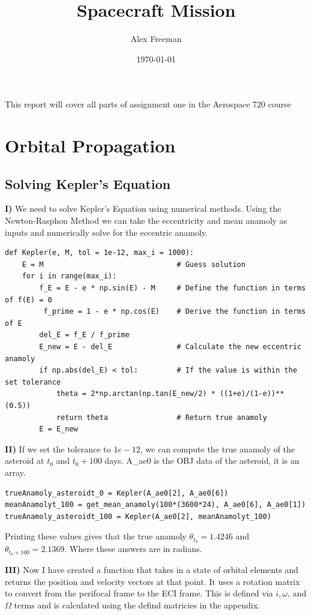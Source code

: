 \documentclass[a4paper, 12pt]{article}  %
\title{Spacecraft Mission}
\author{Alex Freeman}
\date{\today}
\begin{document}
\maketitle


This report will cover all parts of assignment one in the Aerospace 720 course

\section{Orbital Propagation}

\subsection{Solving Kepler's Equation}

\textbf{I)} We need to solve Kepler's Equation using numerical methods. Using the Newton-Rasphon Method we can take the eccentricity and mean anamoly as 
inputs and numerically solve for the eccentric anamoly. 

\begin{lstlisting}
def Kepler(e, M, tol = 1e-12, max_i = 1000):
    E = M                               # Guess solution
    for i in range(max_i):
        f_E = E - e * np.sin(E) - M     # Define the function in terms of f(E) = 0
         f_prime = 1 - e * np.cos(E)    # Derive the function in terms of E
        del_E = f_E / f_prime           
        E_new = E - del_E               # Calculate the new eccentric anamoly
        if np.abs(del_E) < tol:         # If the value is within the set tolerance 
            theta = 2*np.arctan(np.tan(E_new/2) * ((1+e)/(1-e))**(0.5))
            return theta                # Return true anamoly
        E = E_new
\end{lstlisting}
\vspace{0.5cm}
\noindent \textbf{II)} If we set the tolerance to $1e-12$, we can compute the true anamoly of the asteroid 
at $t_0$ and $t_0 + 100$ days. A\_ae0 is the OBJ data of the asteroid, it is an array.
\begin{lstlisting}
trueAnamoly_asteroidt_0 = Kepler(A_ae0[2], A_ae0[6])  
meanAnamolyt_100 = get_mean_anamoly(100*(3600*24), A_ae0[6], A_ae0[1])
trueAnamoly_asteroidt_100 = Kepler(A_ae0[2], meanAnamolyt_100)
\end{lstlisting}
Printing these values gives that the true anamoly $\theta_{t_0} = 1.4246$ and $\theta_{t_0 + 100} = 2.1369$. 
Where these answers are in radians.

\vspace{0.5cm}
\noindent \textbf{III)} Now I have created a function that takes in a state of orbital elements and returns 
the position and velocity vectors at that point. It uses a rotation matrix to convert from 
the perifocal frame to the ECI frame. This is defined via $i, \omega$, and $\Omega$ terms and is 
calculated using the defind matricies in the appendix.
\end{document}
